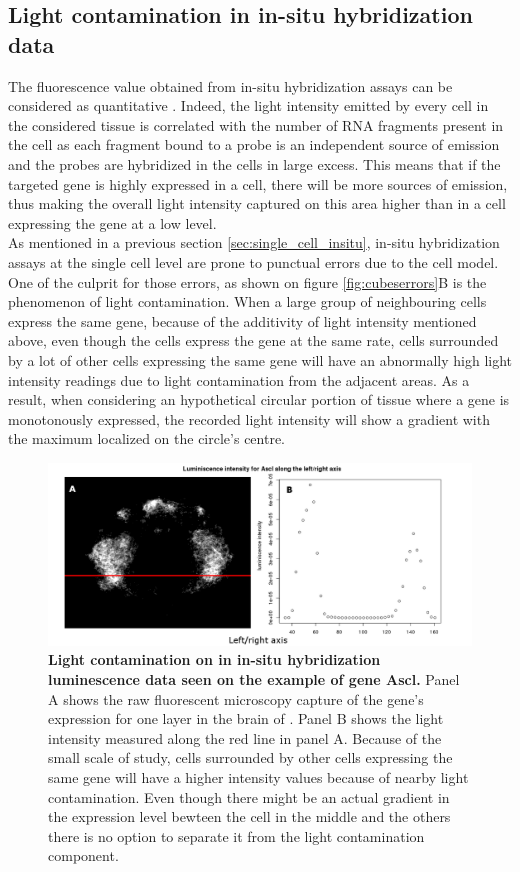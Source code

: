   \subsection{Light contamination in in-situ hybridization data}
  The fluorescence value obtained from in-situ hybridization assays can be considered as quantitative \cite{dorresteijn90}. Indeed, the light intensity emitted by every cell in the considered tissue is correlated with the number of RNA fragments present in the cell as each fragment bound to a probe is an independent source of emission and the probes are hybridized in the cells in large excess. This means that if the targeted gene is highly expressed in a cell, there will be more sources of emission, thus making the overall light intensity captured on this area higher than in a cell expressing the gene at a low level. \\
  
  As mentioned in a previous section \ref{sec:single_cell_insitu}, in-situ hybridization assays at the single cell level are prone to punctual errors due to the cell model. One of the culprit for those errors, as shown on figure \ref{fig:cubeserrors}B is the phenomenon of light contamination. When a large group of neighbouring cells express the same gene, because of the additivity of light intensity mentioned above, even though the cells express the gene at the same rate, cells surrounded by a lot of other cells expressing the same gene will have an abnormally high light intensity readings due to light contamination from the adjacent areas. As a result, when considering an hypothetical circular portion of tissue where a gene is monotonously expressed, the recorded light intensity will show a gradient with the maximum localized on the circle's centre.\\
  
   \begin{figure}[h]
\centerline{\includegraphics[width=\linewidth]{gfx/chapter2/whybina.png}}
\caption{{\bf Light contamination on in in-situ hybridization luminescence data seen on the example of gene Ascl.} Panel A shows the raw fluorescent microscopy capture of the gene's expression for one layer in the brain of \platy{}. Panel B shows the light intensity measured along the red line in panel A. Because of the small scale of study, cells surrounded by other cells expressing the same gene will have a higher intensity values because of nearby light contamination. Even though there might be an actual gradient in the expression level bewteen the cell in the middle and the others there is no option to separate it from the light contamination component.}\label{fig:why_binarize}
	\end{figure}
  
